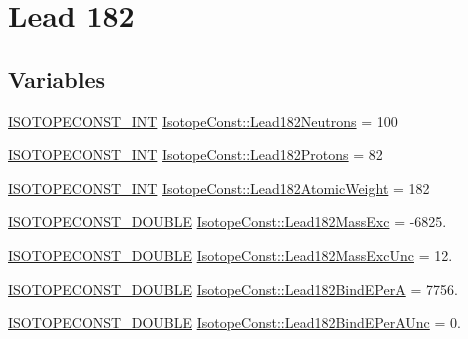 \hypertarget{group___isotope_const-_lead-_pb182}{}\section{Lead 182}
\label{group___isotope_const-_lead-_pb182}
\subsection*{Variables}
\begin{DoxyCompactItemize}
\item 
\mbox{\hyperlink{group___isotope_const-_macros_ga5f18360b3e99483a35c32d789e62621c}{I\+S\+O\+T\+O\+P\+E\+C\+O\+N\+S\+T\+\_\+\+I\+NT}} \mbox{\hyperlink{group___isotope_const-_lead-_pb182_gac85829e90acf7197258819fc400b85b8}{Isotope\+Const\+::\+Lead182\+Neutrons}} = 100
\item 
\mbox{\hyperlink{group___isotope_const-_macros_ga5f18360b3e99483a35c32d789e62621c}{I\+S\+O\+T\+O\+P\+E\+C\+O\+N\+S\+T\+\_\+\+I\+NT}} \mbox{\hyperlink{group___isotope_const-_lead-_pb182_ga36954292d80f05d132811d2ba35f7cab}{Isotope\+Const\+::\+Lead182\+Protons}} = 82
\item 
\mbox{\hyperlink{group___isotope_const-_macros_ga5f18360b3e99483a35c32d789e62621c}{I\+S\+O\+T\+O\+P\+E\+C\+O\+N\+S\+T\+\_\+\+I\+NT}} \mbox{\hyperlink{group___isotope_const-_lead-_pb182_ga901dc49d8501b20e3f3635a6f9dec099}{Isotope\+Const\+::\+Lead182\+Atomic\+Weight}} = 182
\item 
\mbox{\hyperlink{group___isotope_const-_macros_ga8f45a7272ce02c0b4c65c44636ed719a}{I\+S\+O\+T\+O\+P\+E\+C\+O\+N\+S\+T\+\_\+\+D\+O\+U\+B\+LE}} \mbox{\hyperlink{group___isotope_const-_lead-_pb182_ga427e901f866627d36167b8a875599b95}{Isotope\+Const\+::\+Lead182\+Mass\+Exc}} = -\/6825.
\item 
\mbox{\hyperlink{group___isotope_const-_macros_ga8f45a7272ce02c0b4c65c44636ed719a}{I\+S\+O\+T\+O\+P\+E\+C\+O\+N\+S\+T\+\_\+\+D\+O\+U\+B\+LE}} \mbox{\hyperlink{group___isotope_const-_lead-_pb182_ga56fa41dc5cd2fed3f4bd61f371645576}{Isotope\+Const\+::\+Lead182\+Mass\+Exc\+Unc}} = 12.
\item 
\mbox{\hyperlink{group___isotope_const-_macros_ga8f45a7272ce02c0b4c65c44636ed719a}{I\+S\+O\+T\+O\+P\+E\+C\+O\+N\+S\+T\+\_\+\+D\+O\+U\+B\+LE}} \mbox{\hyperlink{group___isotope_const-_lead-_pb182_gaa5ea4b28c528c6ea6468e4bca1704664}{Isotope\+Const\+::\+Lead182\+Bind\+E\+PerA}} = 7756.
\item 
\mbox{\hyperlink{group___isotope_const-_macros_ga8f45a7272ce02c0b4c65c44636ed719a}{I\+S\+O\+T\+O\+P\+E\+C\+O\+N\+S\+T\+\_\+\+D\+O\+U\+B\+LE}} \mbox{\hyperlink{group___isotope_const-_lead-_pb182_gaa439bdfa62f79c519bdef37177389c47}{Isotope\+Const\+::\+Lead182\+Bind\+E\+Per\+A\+Unc}} = 0.

\end{DoxyCompactItemize}
